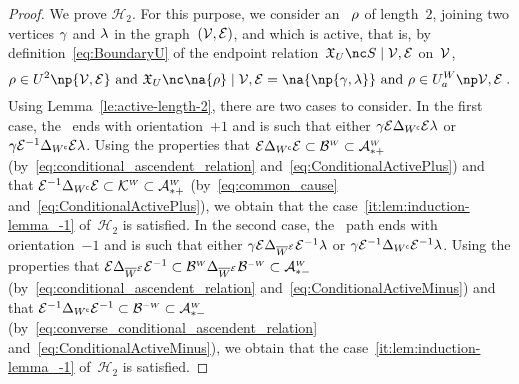 \documentclass[12pt]{article}
\begin{document}
{{\begin{proof}
  We prove ${\mathcal H}_{2}$. For this purpose, we consider an \undirectedEdgePath~$\rho$ of length~$2$,
  joining two vertices $\gamma$ and $\lambda$ in the graph~$({\cal V},{\cal E})$, and 
  which is active, that is, by definition~\eqref{eq:BoundaryU} of the
  endpoint relation~\( \BoundaryU{\SubsetPath}{\OrientedGraph} \) on~${\cal V}$, 
  \begin{equation*}
    \UndirectedPath \in \UPATH^{2}\np{\graph}
    \text{ and }
    \BoundaryU{\na{\UndirectedPath}}{\graph}=\na{ \np{\bgent,\cgent} }
    \text{ and }
    \UndirectedPath \in \ActiveUndirectedPaths{\graph}
    \eqfinp 
  \end{equation*}
  Using Lemma~\ref{le:active-length-2}, there are two cases to consider.
  In the first case, the \undirectedEdgePath\ ends with orientation~$+1$  and is
  such that
  either \(\gamma  {\cal E} \Delta_{W^{\mathsf{c}}}{\cal E}  \lambda\)
  or \(\gamma   {\cal E}^{-1} \Delta_{W^{\mathsf{c}}} {\cal E}  \lambda\).
  Using the properties that
  \( {\cal E} \Delta_{W^{\mathsf{c}}}{\cal E}
  \subset \mathcal{B}^{\text{\tiny $W$}}
  \subset \mathcal{A}^{\text{\tiny $W$}}_{*+}\)
  (by~\eqref{eq:conditional_ascendent_relation} and~\eqref{eq:ConditionalActivePlus})
  and that 
  \( {\cal E}^{-1} \Delta_{W^{\mathsf{c}}} {\cal E}
  \subset \mathcal{K}^{\text{\tiny $W$}} \subset \mathcal{A}^{\text{\tiny $W$}}_{*+}\)
  (by~\eqref{eq:common_cause} and~\eqref{eq:ConditionalActivePlus}),
  we obtain that
  the case~\ref{it:lem:induction-lemma_-1} of~${\mathcal H}_2$ is satisfied.
  In the second case, the \undirectedEdgePath\ path ends with orientation~$-1$ and is
  such that
  either 
  \( \gamma{\cal E} \Delta_{\overline{W}^{\text{\tiny ${\cal E}$}}} {\cal E}^{-1}\lambda \)
  or \( \gamma {\cal E}^{-1} \Delta_{W^{\mathsf{c}}}{\cal E}^{-1} \lambda\).
  Using the properties that
  \({\cal E} \Delta_{\overline{W}^{\text{\tiny ${\cal E}$}}} {\cal E}^{-1}
  \subset   \mathcal{B}^{\text{\tiny $W$}}  \Delta_{\overline{W}^{\text{\tiny ${\cal E}$}}} \mathcal{B}^{\text{\tiny$-W$}}
  \subset \mathcal{A}^{\text{\tiny $W$}}_{*-} \)
  (by~\eqref{eq:conditional_ascendent_relation}
  and~\eqref{eq:ConditionalActiveMinus})
  and that
  \({\cal E}^{-1} \Delta_{W^{\mathsf{c}}}{\cal E}^{-1}
  \subset \mathcal{B}^{\text{\tiny$-W$}}\subset \mathcal{A}^{\text{\tiny $W$}}_{*-}\)
  (by~\eqref{eq:converse_conditional_ascendent_relation}
  and~\eqref{eq:ConditionalActiveMinus}),
  we obtain that the case~\ref{it:lem:induction-lemma_-1} of~${\mathcal H}_2$ is
  satisfied.
  

\end{proof}}}
\end{document}
